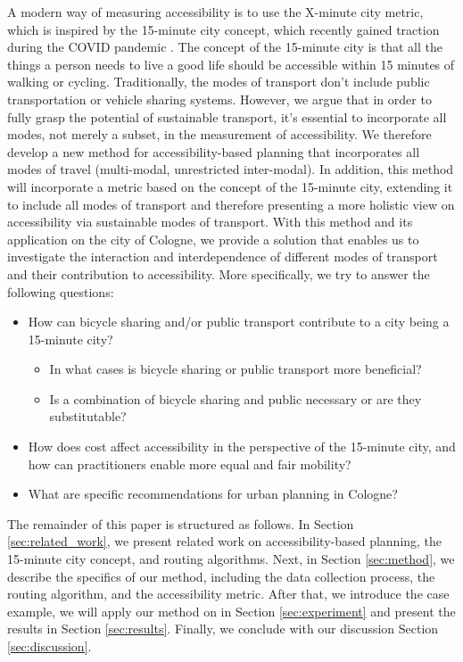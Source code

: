 A modern way of measuring accessibility is to use the X-minute city metric, which is inspired by the 15-minute city concept, which recently gained traction during the COVID pandemic \cite{morenoIntroducing15MinuteCity2021}.
The concept of the 15-minute city is that all the things a person needs to live a good life should be accessible within 15 minutes of walking or cycling.
Traditionally, the modes of transport don't include public transportation or vehicle sharing systems.
However, we argue that in order to fully grasp the potential of sustainable transport, it's essential to incorporate all modes, not merely a subset, in the measurement of accessibility.
We therefore develop a new method for accessibility-based planning that incorporates all modes of travel (multi-modal, unrestricted inter-modal).
In addition, this method will incorporate a metric based on the concept of the 15-minute city, extending it to include all modes of transport and therefore presenting a more holistic view on accessibility via sustainable modes of transport.
With this method and its application on the city of Cologne, we provide a solution that enables us to investigate the interaction and interdependence of different modes of transport and their contribution to accessibility. 
More specifically, we try to answer the following questions:
\begin{itemize}
  \item How can bicycle sharing and/or public transport contribute to a city being a 15-minute city?
  \begin{itemize}
    \item In what cases is bicycle sharing or public transport more beneficial?
    \item Is a combination of bicycle sharing and public necessary or are they substitutable?
  \end{itemize}
  \item How does cost affect accessibility in the perspective of the 15-minute city, and how can practitioners enable more equal and fair mobility?
  \item What are specific recommendations for urban planning in Cologne?
\end{itemize}


The remainder of this paper is structured as follows.
In Section \ref{sec:related_work}, we present related work on accessibility-based planning, the 15-minute city concept, and routing algorithms.
Next, in Section \ref{sec:method}, we describe the specifics of our method, including the data collection process, the routing algorithm, and the accessibility metric.
After that, we introduce the case example, we will apply our method on in Section \ref{sec:experiment} and present the results in Section \ref{sec:results}.
Finally, we conclude with our discussion Section \ref{sec:discussion}.

